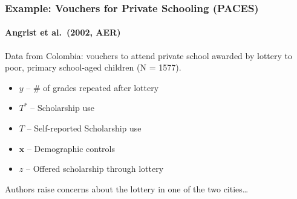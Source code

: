 \documentclass{beamer}
\begin{document}
\begin{frame}
  \frametitle{Example: Vouchers for Private Schooling (PACES)}
  \framesubtitle{Angrist et al.\ (2002, AER)}

  Data from Colombia: vouchers to attend private school awarded by lottery to poor, primary school-aged children (N = 1577). 
  

\begin{itemize}
  \item $y$ -- \# of grades repeated after lottery
  \item $T^*$ -- Scholarship use 
  \item $T$ -- Self-reported Scholarship use
  \item $\mathbf{x}$ -- Demographic controls
  \item $z$ -- Offered scholarship through lottery 
\end{itemize}

\alert{Authors raise concerns about the lottery in one of the two cities\ldots}
\end{frame}
\end{document}

